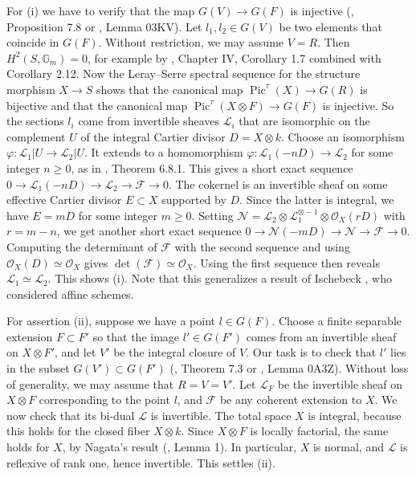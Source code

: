\documentclass[oneside, 12pt]{amsart}
\theoremstyle{definition}
\theoremstyle{remark}
\newcommand{\GG}{\mathbb{G}}
\newcommand{\shF}{\mathscr{F}}
\newcommand{\shN}{\mathscr{N}}
\newcommand{\shL}{\mathscr{L}}
\renewcommand{\O}{\mathscr{O}}
\newcommand{\Pic}{\operatorname{Pic}}
\newcommand{\ra}{\rightarrow}
\begin{document}
For (i) we have to verify 
that the map $G(V)\ra G(F)$ is injective (\cite{Laumon; Moret-Bailly 2000}, Proposition 7.8 or \cite{SP}, Lemma 03KV).
Let $l_1,l_2\in G(V)$ be two elements that coincide in $G(F)$.
Without restriction, we may assume $V=R$. Then $H^2(S,\GG_m)=0$, for example by \cite{Milne 1980}, Chapter IV, Corollary 1.7 combined with Corollary 2.12. 
Now the Leray--Serre spectral sequence for the structure morphism $X\ra S$   shows that 
the canonical map $\Pic^\tau(X)\ra G(R)$ is bijective and that the canonical map $\Pic^\tau(X\otimes F)\ra G(F)$ is injective.
So the sections $l_i$ come from invertible sheaves
$\shL_i$ that are isomorphic on the complement $U$ of the integral Cartier divisor $D=X\otimes k$.
Choose an isomorphism $\varphi:\shL_1|U\ra \shL_2|U$.
It extends to  a homomorphism $\varphi:\shL_1(-nD)\ra\shL_2$
for some integer $n\geq 0$, as in \cite{EGA I}, Theorem 6.8.1. This gives a short exact sequence
$0\ra \shL_1(-nD)\ra \shL_2\ra \shF\ra 0$.
The cokernel  is an invertible sheaf on some effective Cartier divisor $E\subset X$
supported by $D$. Since the latter is integral, we have $E=mD$ for some integer $m\geq 0$.
Setting $\shN=\shL_2\otimes\shL_1^{\otimes-1}\otimes\O_X(rD)$ with $r=m-n$,  we get another
short exact sequence $0\ra \shN(-mD)\ra \shN\ra \shF\ra 0$.
Computing the determinant of $\shF$  with the second sequence  and using $\O_X(D)\simeq\O_X$ gives
$\det(\shF)\simeq\O_X$. Using the first sequence then reveals  $\shL_1\simeq\shL_2$. This shows (i). Note that this generalizes a result
of Ischebeck \cite{Ischebeck 1979}, who considered affine schemes.

For assertion (ii), suppose we have a point $l\in G(F)$. Choose a finite separable extension $F\subset F'$ so 
that the image $l'\in G(F')$ comes from an invertible sheaf   on $X\otimes F'$, and let
$V'$ be the integral closure of $V$. Our task is to check that $l'$ lies in the subset $G(V')\subset G(F')$
(\cite{Laumon; Moret-Bailly 2000}, Theorem 7.3 or \cite{SP}, Lemma 0A3Z).
Without loss of generality, we may assume that $R=V=V'$. 
Let $\shL_F$ be the invertible sheaf on $X\otimes F$ corresponding to the point $l$,
and $\shF$ be any coherent extension to $X$. We now check that its bi-dual $\shL$
is invertible.
The total space $X$ is integral, because this holds for the closed fiber $X\otimes k$.
Since $X\otimes F$ is locally factorial, the same holds for $X$, by Nagata's result (\cite{Nagata 1957}, Lemma 1).
In particular, $X$ is normal, and $\shL$ is reflexive of rank one, hence invertible.
This settles (ii). 
\end{document}
